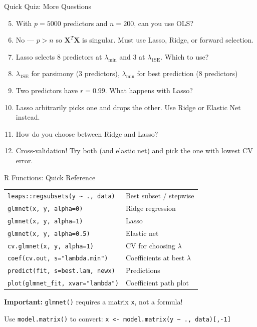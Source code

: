 \documentclass[aspectratio=169, 11pt]{beamer}
\begin{document}
\begin{frame}{Quick Quiz: More Questions}
\begin{enumerate}
  \setcounter{enumi}{4}
  \item With $p = 5000$ predictors and $n = 200$, can you use OLS?
  \pause
  \item[]{\textcolor{muted}{\footnotesize No --- $p > n$ so $\mathbf{X}^T\mathbf{X}$ is singular. Must use Lasso, Ridge, or forward selection.}}
  \vspace{0.3em}
  \item Lasso selects 8 predictors at $\lambda_{\min}$ and 3 at $\lambda_{\text{1SE}}$. Which to use?
  \pause
  \item[]{\textcolor{muted}{\footnotesize $\lambda_{\text{1SE}}$ for parsimony (3 predictors), $\lambda_{\min}$ for best prediction (8 predictors)}}
  \vspace{0.3em}
  \item Two predictors have $r = 0.99$. What happens with Lasso?
  \pause
  \item[]{\textcolor{muted}{\footnotesize Lasso arbitrarily picks one and drops the other. Use Ridge or Elastic Net instead.}}
  \vspace{0.3em}
  \item How do you choose between Ridge and Lasso?
  \pause
  \item[]{\textcolor{muted}{\footnotesize Cross-validation! Try both (and elastic net) and pick the one with lowest CV error.}}
\end{enumerate}
\end{frame}

\begin{frame}{R Functions: Quick Reference}
\begin{center}
\begin{tabular}{ll}
\toprule
\texttt{leaps::regsubsets(y \textasciitilde{} ., data)} & Best subset / stepwise \\
\texttt{glmnet(x, y, alpha=0)} & Ridge regression \\
\texttt{glmnet(x, y, alpha=1)} & Lasso \\
\texttt{glmnet(x, y, alpha=0.5)} & Elastic net \\
\texttt{cv.glmnet(x, y, alpha=1)} & CV for choosing $\lambda$ \\
\texttt{coef(cv.out, s="lambda.min")} & Coefficients at best $\lambda$ \\
\texttt{predict(fit, s=best.lam, newx)} & Predictions \\
\texttt{plot(glmnet\_fit, xvar="lambda")} & Coefficient path plot \\
\bottomrule
\end{tabular}
\end{center}
\vspace{0.3em}
\textbf{Important:} \texttt{glmnet()} requires a matrix \texttt{x}, not a formula!

Use \texttt{model.matrix()} to convert: \texttt{x <- model.matrix(y \textasciitilde{} ., data)[,-1]}
\end{frame}
\end{document}
